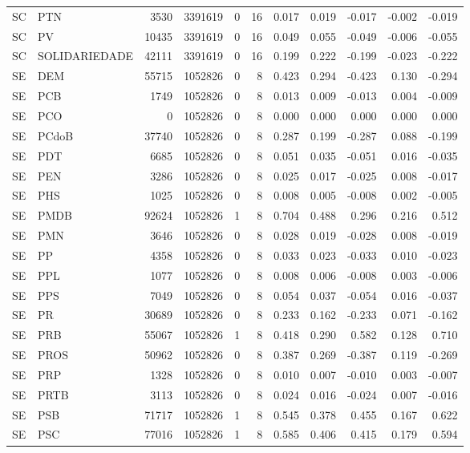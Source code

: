 \begin{landscape}
\begin{longtable}{llrrrrrrrrr}
SC & PTN & 3530 & 3391619 & 0 & 16 & 0.017 & 0.019 & -0.017 & -0.002 & -0.019 \\
SC & PV & 10435 & 3391619 & 0 & 16 & 0.049 & 0.055 & -0.049 & -0.006 & -0.055 \\
SC & SOLIDARIEDADE & 42111 & 3391619 & 0 & 16 & 0.199 & 0.222 & -0.199 & -0.023 & -0.222 \\
SE & DEM & 55715 & 1052826 & 0 & 8 & 0.423 & 0.294 & -0.423 & 0.130 & -0.294 \\
SE & PCB & 1749 & 1052826 & 0 & 8 & 0.013 & 0.009 & -0.013 & 0.004 & -0.009 \\
SE & PCO & 0 & 1052826 & 0 & 8 & 0.000 & 0.000 & 0.000 & 0.000 & 0.000 \\
SE & PCdoB & 37740 & 1052826 & 0 & 8 & 0.287 & 0.199 & -0.287 & 0.088 & -0.199 \\
SE & PDT & 6685 & 1052826 & 0 & 8 & 0.051 & 0.035 & -0.051 & 0.016 & -0.035 \\
SE & PEN & 3286 & 1052826 & 0 & 8 & 0.025 & 0.017 & -0.025 & 0.008 & -0.017 \\
SE & PHS & 1025 & 1052826 & 0 & 8 & 0.008 & 0.005 & -0.008 & 0.002 & -0.005 \\
SE & PMDB & 92624 & 1052826 & 1 & 8 & 0.704 & 0.488 & 0.296 & 0.216 & 0.512 \\
SE & PMN & 3646 & 1052826 & 0 & 8 & 0.028 & 0.019 & -0.028 & 0.008 & -0.019 \\
SE & PP & 4358 & 1052826 & 0 & 8 & 0.033 & 0.023 & -0.033 & 0.010 & -0.023 \\
SE & PPL & 1077 & 1052826 & 0 & 8 & 0.008 & 0.006 & -0.008 & 0.003 & -0.006 \\
SE & PPS & 7049 & 1052826 & 0 & 8 & 0.054 & 0.037 & -0.054 & 0.016 & -0.037 \\
SE & PR & 30689 & 1052826 & 0 & 8 & 0.233 & 0.162 & -0.233 & 0.071 & -0.162 \\
SE & PRB & 55067 & 1052826 & 1 & 8 & 0.418 & 0.290 & 0.582 & 0.128 & 0.710 \\
SE & PROS & 50962 & 1052826 & 0 & 8 & 0.387 & 0.269 & -0.387 & 0.119 & -0.269 \\
SE & PRP & 1328 & 1052826 & 0 & 8 & 0.010 & 0.007 & -0.010 & 0.003 & -0.007 \\
SE & PRTB & 3113 & 1052826 & 0 & 8 & 0.024 & 0.016 & -0.024 & 0.007 & -0.016 \\
SE & PSB & 71717 & 1052826 & 1 & 8 & 0.545 & 0.378 & 0.455 & 0.167 & 0.622 \\
SE & PSC & 77016 & 1052826 & 1 & 8 & 0.585 & 0.406 & 0.415 & 0.179 & 0.594 \\

\end{longtable}
\end{landscape}

